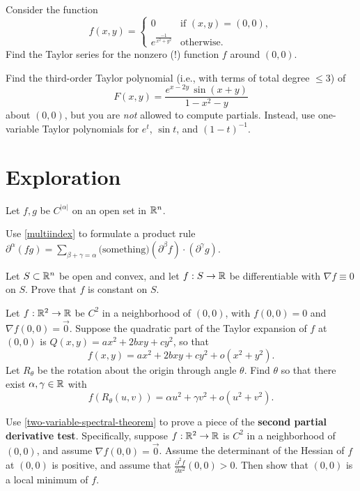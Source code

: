 \documentclass{homework}
\begin{document}
\begin{problem}
  Consider the function
  \[
    f(x,y)=\begin{cases}
      0 & \text{if } (x,y)=(0,0), \\
      e^{\frac{-1}{x^2+y^2}} & \text{otherwise.}
    \end{cases}
  \]
  Find the Taylor series for the nonzero (!) function $f$ around $(0,0)$.
\end{problem}

\begin{problem}
Find the third-order Taylor polynomial (i.e., with terms of total degree $\le 3$) of
\[
F(x,y)=\frac{e^{x-2y}\,\sin(x+y)}{1-x^2-y}
\]
about $(0,0)$, but you are \textit{not} allowed to compute partials. Instead, use one-variable Taylor polynomials for $e^t$, $\sin t$, and $(1-t)^{-1}$.
\end{problem}

\section{Exploration}

\begin{problem}
Let $f,g$ be $C^{|\alpha|}$ on an open set in $\mathbb{R}^n$.

Use \ref{multiindex} to formulate a product rule
\(
  \partial^\alpha (fg)=\displaystyle\sum_{\beta + \gamma = \alpha} \text{(something)} (\partial^\beta f)\cdot (\partial^\gamma g).
\)
\end{problem}

\begin{problem}
Let $S\subset \mathbb{R}^n$ be open and convex, and let $f:S\to\mathbb{R}$ be differentiable with $\nabla f\equiv 0$ on $S$.
Prove that $f$ is constant on $S$.
\end{problem}

\begin{problem}\label{two-variable-spectral-theorem}%
Let $f:\mathbb{R}^2\to\mathbb{R}$ be $C^2$ in a neighborhood of $(0,0)$, with $f(0,0)=0$ and
$\nabla f(0,0)=\vec{0}$. Suppose the quadratic part of the Taylor expansion of $f$
at $(0,0)$ is \(Q(x,y)=ax^2+2bxy+cy^2\), so that
\[
  f(x,y)=ax^2+2bxy+cy^2+o(x^2+y^2).
\]
Let $R_\theta$ be the rotation about the origin through angle $\theta$.
Find $\theta$ so that there exist $\alpha,\gamma\in\mathbb{R}$ with
\[
  f(R_\theta(u,v))=\alpha u^2+\gamma v^2+o(u^2+v^2).
\]
\end{problem}

\begin{problem}
  Use \ref{two-variable-spectral-theorem} to prove a piece of the \textbf{second partial derivative test}.
  Specifically, suppose $f:\mathbb{R}^2\to\mathbb{R}$ is $C^2$ in a neighborhood of $(0,0)$, and assume $\nabla f(0,0)=\vec{0}$.
  Assume the determinant of the Hessian of $f$ at $(0,0)$ is positive, and assume that
  $\displaystyle\frac{\partial^2 f}{\partial x^2}(0,0)>0$. Then show that $(0,0)$ is a local minimum of $f$.
\end{problem}
\end{document}
